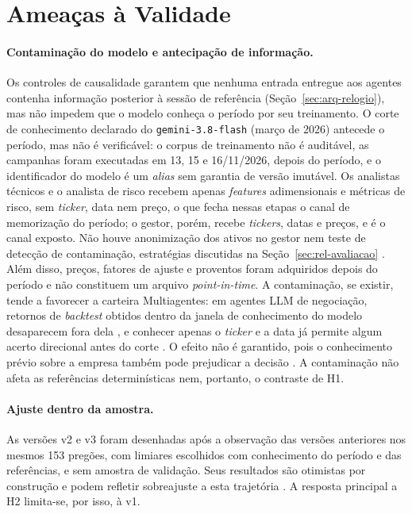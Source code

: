 \section{Ameaças à Validade}
\label{sec:met-ameacas}

\paragraph*{Contaminação do modelo e antecipação de informação.} Os controles de causalidade garantem que nenhuma entrada entregue aos agentes contenha informação posterior à sessão de referência (Seção~\ref{sec:arq-relogio}), mas não impedem que o modelo conheça o período por seu treinamento. O corte de conhecimento declarado do \texttt{gemini-3.8-flash} (março de 2026) antecede o período, mas não é verificável: o corpus de treinamento não é auditável, as campanhas foram executadas em 13, 15 e 16/11/2026, depois do período, e o identificador do modelo é um \textit{alias} sem garantia de versão imutável. Os analistas técnicos e o analista de risco recebem apenas \textit{features} adimensionais e métricas de risco, sem \textit{ticker}, data nem preço, o que fecha nessas etapas o canal de memorização do período; o gestor, porém, recebe \textit{tickers}, datas e preços, e é o canal exposto. Não houve anonimização dos ativos no gestor nem teste de detecção de contaminação, estratégias discutidas na Seção~\ref{sec:rel-avaliacao} \citep{Glasserman2023, Golchin2024, Drinkall2024}. Além disso, preços, fatores de ajuste e proventos foram adquiridos depois do período e não constituem um arquivo \textit{point-in-time}. A contaminação, se existir, tende a favorecer a carteira Multiagentes: em agentes LLM de negociação, retornos de \textit{backtest} obtidos dentro da janela de conhecimento do modelo desaparecem fora dela \citep{ProfitMirage2025}, e conhecer apenas o \textit{ticker} e a data já permite algum acerto direcional antes do corte \citep{Wang2026}. O efeito não é garantido, pois o conhecimento prévio sobre a empresa também pode prejudicar a decisão \citep{Glasserman2023}. A contaminação não afeta as referências determinísticas nem, portanto, o contraste de H1.

\paragraph*{Ajuste dentro da amostra.} As versões v2 e v3 foram desenhadas após a observação das versões anteriores nos mesmos 153 pregões, com limiares escolhidos com conhecimento do período e das referências, e sem amostra de validação. Seus resultados são otimistas por construção e podem refletir sobreajuste a esta trajetória \citep{White2000, Bailey2017}. A resposta principal a H2 limita-se, por isso, à v1.

